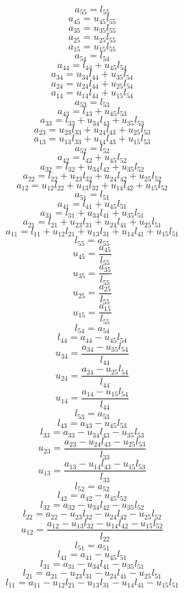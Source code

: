 \documentclass[10pt,a4paper,dvipdfmx]{article}
\begin{document}
\begin{multicols}{2}
$$ a_{{5}{5}} = l_{{5}{5}} $$
$$ a_{{4}{5}} = u_{{4}{5}} l_{{5}{5}} $$
$$ a_{{3}{5}} = u_{{3}{5}} l_{{5}{5}} $$
$$ a_{{2}{5}} = u_{{2}{5}} l_{{5}{5}} $$
$$ a_{{1}{5}} = u_{{1}{5}} l_{{5}{5}} $$
$$ a_{{5}{4}} = l_{{5}{4}} $$
$$ a_{{4}{4}} = l_{{4}{4}} + u_{{4}{5}} l_{{5}{4}} $$
$$ a_{{3}{4}} = u_{{3}{4}} l_{{4}{4}} + u_{{3}{5}} l_{{5}{4}} $$
$$ a_{{2}{4}} = u_{{2}{4}} l_{{4}{4}} + u_{{2}{5}} l_{{5}{4}} $$
$$ a_{{1}{4}} = u_{{1}{4}} l_{{4}{4}} + u_{{1}{5}} l_{{5}{4}} $$
$$ a_{{5}{3}} = l_{{5}{3}} $$
$$ a_{{4}{3}} = l_{{4}{3}} + u_{{4}{5}} l_{{5}{3}} $$
$$ a_{{3}{3}} = l_{{3}{3}} + u_{{3}{4}} l_{{4}{3}} + u_{{3}{5}} l_{{5}{3}} $$
$$ a_{{2}{3}} = u_{{2}{3}} l_{{3}{3}} + u_{{2}{4}} l_{{4}{3}} + u_{{2}{5}} l_{{5}{3}} $$
$$ a_{{1}{3}} = u_{{1}{3}} l_{{3}{3}} + u_{{1}{4}} l_{{4}{3}} + u_{{1}{5}} l_{{5}{3}} $$
$$ a_{{5}{2}} = l_{{5}{2}} $$
$$ a_{{4}{2}} = l_{{4}{2}} + u_{{4}{5}} l_{{5}{2}} $$
$$ a_{{3}{2}} = l_{{3}{2}} + u_{{3}{4}} l_{{4}{2}} + u_{{3}{5}} l_{{5}{2}} $$
$$ a_{{2}{2}} = l_{{2}{2}} + u_{{2}{3}} l_{{3}{2}} + u_{{2}{4}} l_{{4}{2}} + u_{{2}{5}} l_{{5}{2}} $$
$$ a_{{1}{2}} = u_{{1}{2}} l_{{2}{2}} + u_{{1}{3}} l_{{3}{2}} + u_{{1}{4}} l_{{4}{2}} + u_{{1}{5}} l_{{5}{2}} $$
$$ a_{{5}{1}} = l_{{5}{1}} $$
$$ a_{{4}{1}} = l_{{4}{1}} + u_{{4}{5}} l_{{5}{1}} $$
$$ a_{{3}{1}} = l_{{3}{1}} + u_{{3}{4}} l_{{4}{1}} + u_{{3}{5}} l_{{5}{1}} $$
$$ a_{{2}{1}} = l_{{2}{1}} + u_{{2}{3}} l_{{3}{1}} + u_{{2}{4}} l_{{4}{1}} + u_{{2}{5}} l_{{5}{1}} $$
$$ a_{{1}{1}} = l_{{1}{1}} + u_{{1}{2}} l_{{2}{1}} + u_{{1}{3}} l_{{3}{1}} + u_{{1}{4}} l_{{4}{1}} + u_{{1}{5}} l_{{5}{1}} $$
\vfill\null
\columnbreak
$$ l_{{5}{5}} = a_{{5}{5}} $$
$$ u_{{4}{5}} = \dfrac{a_{{4}{5}}}{l_{{5}{5}}} $$
$$ u_{{3}{5}} = \dfrac{a_{{3}{5}}}{l_{{5}{5}}} $$
$$ u_{{2}{5}} = \dfrac{a_{{2}{5}}}{l_{{5}{5}}} $$
$$ u_{{1}{5}} = \dfrac{a_{{1}{5}}}{l_{{5}{5}}} $$
$$ l_{{5}{4}} = a_{{5}{4}} $$
$$ l_{{4}{4}} = a_{{4}{4}}- u_{{4}{5}} l_{{5}{4}} $$
$$ u_{{3}{4}} = \dfrac{a_{{3}{4}}- u_{{3}{5}} l_{{5}{4}}}{l_{{4}{4}}} $$
$$ u_{{2}{4}} = \dfrac{a_{{2}{4}}- u_{{2}{5}} l_{{5}{4}}}{l_{{4}{4}}} $$
$$ u_{{1}{4}} = \dfrac{a_{{1}{4}}- u_{{1}{5}} l_{{5}{4}}}{l_{{4}{4}}} $$
$$ l_{{5}{3}} = a_{{5}{3}} $$
$$ l_{{4}{3}} = a_{{4}{3}}- u_{{4}{5}} l_{{5}{3}} $$
$$ l_{{3}{3}} = a_{{3}{3}}- u_{{3}{4}} l_{{4}{3}}- u_{{3}{5}} l_{{5}{3}} $$
$$ u_{{2}{3}} = \dfrac{a_{{2}{3}}- u_{{2}{4}} l_{{4}{3}}- u_{{2}{5}} l_{{5}{3}}}{l_{{3}{3}}} $$
$$ u_{{1}{3}} = \dfrac{a_{{1}{3}}- u_{{1}{4}} l_{{4}{3}}- u_{{1}{5}} l_{{5}{3}}}{l_{{3}{3}}} $$
$$ l_{{5}{2}} = a_{{5}{2}} $$
$$ l_{{4}{2}} = a_{{4}{2}}- u_{{4}{5}} l_{{5}{2}} $$
$$ l_{{3}{2}} = a_{{3}{2}}- u_{{3}{4}} l_{{4}{2}}- u_{{3}{5}} l_{{5}{2}} $$
$$ l_{{2}{2}} = a_{{2}{2}}- u_{{2}{3}} l_{{3}{2}}- u_{{2}{4}} l_{{4}{2}}- u_{{2}{5}} l_{{5}{2}} $$
$$ u_{{1}{2}} = \dfrac{a_{{1}{2}}- u_{{1}{3}} l_{{3}{2}}- u_{{1}{4}} l_{{4}{2}}- u_{{1}{5}} l_{{5}{2}}}{l_{{2}{2}}} $$
$$ l_{{5}{1}} = a_{{5}{1}} $$
$$ l_{{4}{1}} = a_{{4}{1}}- u_{{4}{5}} l_{{5}{1}} $$
$$ l_{{3}{1}} = a_{{3}{1}}- u_{{3}{4}} l_{{4}{1}}- u_{{3}{5}} l_{{5}{1}} $$
$$ l_{{2}{1}} = a_{{2}{1}}- u_{{2}{3}} l_{{3}{1}}- u_{{2}{4}} l_{{4}{1}}- u_{{2}{5}} l_{{5}{1}} $$
$$ l_{{1}{1}} = a_{{1}{1}}- u_{{1}{2}} l_{{2}{1}}- u_{{1}{3}} l_{{3}{1}}- u_{{1}{4}} l_{{4}{1}}- u_{{1}{5}} l_{{5}{1}} $$
\end{multicols}
\end{document}
